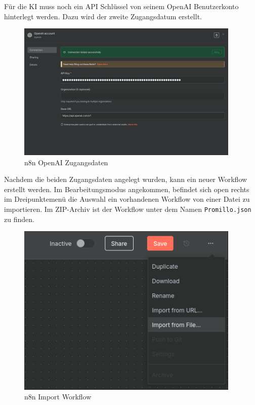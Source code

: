 Für die KI muss noch ein API Schlüssel von seinem OpenAI Benutzerkonto hinterlegt werden. Dazu wird
der zweite Zugangsdatum erstellt.

\begin{figure}
    \begin{center}
        \includegraphics[width=0.95\textwidth]{images/n8n_openai_creds.png}
    \end{center}
    \caption{n8n OpenAI Zugangsdaten}\label{fig:n8n_openai_creds}
\end{figure}

Nachdem die beiden Zugangsdaten angelegt wurden, kann ein neuer Workflow erstellt werden. Im
Bearbeitungsmodus angekommen, befindet sich open rechts im Dreipunktemenü die Auswahl ein
vorhandenen Workflow von einer Datei zu importieren. Im ZIP-Archiv ist der Workflow unter dem Namen
\verb|Promillo.json| zu finden.

\begin{figure}
    \begin{center}
        \includegraphics[width=0.95\textwidth]{images/n8n_import.png}
    \end{center}
    \caption{n8n Import Workflow}\label{fig:n8n_import}
\end{figure}

